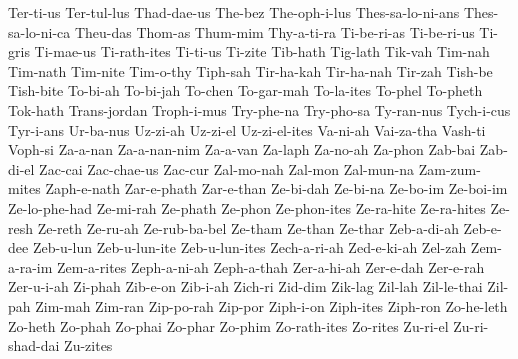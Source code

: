 {  Ter-ti-us Ter-tul-lus Thad-dae-us The-bez The-oph-i-lus Thes-sa-lo-ni-ans
  Thes-sa-lo-ni-ca Theu-das Thom-as Thum-mim Thy-a-ti-ra Ti-be-ri-as
  Ti-be-ri-us Ti-gris Ti-mae-us Ti-rath-ites Ti-ti-us Ti-zite
  Tib-hath Tig-lath Tik-vah Tim-nah Tim-nath Tim-nite
  Tim-o-thy Tiph-sah Tir-ha-kah Tir-ha-nah Tir-zah Tish-be
  Tish-bite To-bi-ah To-bi-jah To-chen To-gar-mah To-la-ites
  To-phel To-pheth Tok-hath Trans-jordan Troph-i-mus Try-phe-na
  Try-pho-sa Ty-ran-nus Tych-i-cus Tyr-i-ans Ur-ba-nus Uz-zi-ah
  Uz-zi-el Uz-zi-el-ites Va-ni-ah Vai-za-tha Vash-ti Voph-si
  Za-a-nan Za-a-nan-nim Za-a-van Za-laph Za-no-ah Za-phon
  Zab-bai Zab-di-el Zac-cai Zac-chae-us Zac-cur Zal-mo-nah
  Zal-mon Zal-mun-na Zam-zum-mites Zaph-e-nath Zar-e-phath Zar-e-than
  Ze-bi-dah Ze-bi-na Ze-bo-im Ze-boi-im Ze-lo-phe-had Ze-mi-rah
  Ze-phath Ze-phon Ze-phon-ites Ze-ra-hite Ze-ra-hites Ze-resh
  Ze-reth Ze-ru-ah Ze-rub-ba-bel Ze-tham Ze-than Ze-thar
  Zeb-a-di-ah Zeb-e-dee Zeb-u-lun Zeb-u-lun-ite Zeb-u-lun-ites Zech-a-ri-ah
  Zed-e-ki-ah Zel-zah Zem-a-ra-im Zem-a-rites Zeph-a-ni-ah Zeph-a-thah
  Zer-a-hi-ah Zer-e-dah Zer-e-rah Zer-u-i-ah Zi-phah Zib-e-on
  Zib-i-ah Zich-ri Zid-dim Zik-lag Zil-lah Zil-le-thai
  Zil-pah Zim-mah Zim-ran Zip-po-rah Zip-por Ziph-i-on
  Ziph-ites Ziph-ron Zo-he-leth Zo-heth Zo-phah Zo-phai
  Zo-phar Zo-phim Zo-rath-ites Zo-rites Zu-ri-el Zu-ri-shad-dai
  Zu-zites
}
